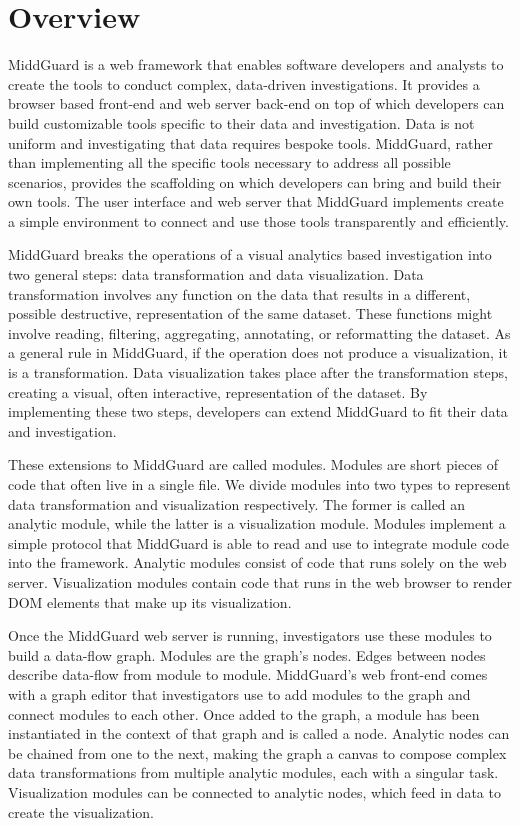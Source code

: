 \documentclass[midd]{thesis}
\begin{document}
\section{Overview}

MiddGuard is a web framework that enables software developers and analysts to
create the tools to conduct complex, data-driven investigations. It provides a
browser based front-end and web server back-end on top of which developers can
build customizable tools specific to their data and investigation. Data is not
uniform and investigating that data requires bespoke tools. MiddGuard,
rather than implementing all the specific tools necessary to address all
possible scenarios, provides the scaffolding on which developers can bring and
build their own tools. The user interface and web server that MiddGuard
implements create a simple environment to connect and use those tools
transparently and efficiently.

MiddGuard breaks the operations of a visual analytics based investigation into
two general steps: data transformation and data visualization. Data
transformation involves any function on the data that results in a different,
possible destructive, representation of the same dataset. These functions might
involve reading, filtering, aggregating, annotating, or reformatting the
dataset. As a general rule in MiddGuard, if the operation does not produce a
visualization, it is a transformation. Data visualization takes place after the
transformation steps, creating a visual, often interactive, representation of
the dataset. By implementing these two steps, developers can extend MiddGuard to
fit their data and investigation.

These extensions to MiddGuard are called modules. Modules are short pieces of
code that often live in a single file. We divide modules into two types to
represent data transformation and visualization respectively. The former is
called an analytic module, while the latter is a visualization module. Modules
implement a simple protocol that MiddGuard is able to read and use to integrate
module code into the framework. Analytic modules consist of code that runs
solely on the web server. Visualization modules contain code that runs in the
web browser to render DOM elements that make up its visualization.

Once the MiddGuard web server is running, investigators use these modules to
build a data-flow graph. Modules are the graph's nodes. Edges between nodes
describe data-flow from module to module. MiddGuard's web front-end comes with a
graph editor that investigators use to add modules to the graph and connect
modules to each other. Once added to the graph, a module has been instantiated
in the context of that graph and is called a node. Analytic nodes can be chained
from one to the next, making the graph a canvas to compose complex data
transformations from multiple analytic modules, each with a singular task.
Visualization modules can be connected to analytic nodes, which feed in data to
create the visualization.
\end{document}
